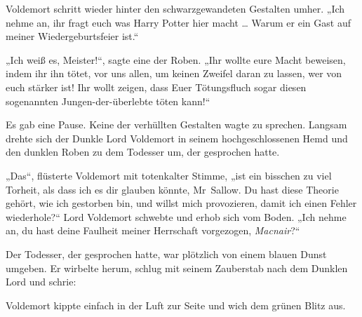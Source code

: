 Voldemort schritt wieder hinter den schwarzgewandeten Gestalten umher.
„Ich nehme an, ihr fragt euch was Harry Potter hier macht … Warum er ein Gast auf meiner Wiedergeburtsfeier ist.“

„Ich weiß es, Meister!“, sagte eine der Roben.
„Ihr wollte eure Macht beweisen, indem ihr ihn tötet, vor uns allen, um keinen Zweifel daran zu lassen, wer von euch stärker ist! Ihr wollt zeigen, dass Euer Tötungsfluch sogar diesen sogenannten Jungen-der-überlebte töten kann!“

Es gab eine Pause.
Keine der verhüllten Gestalten wagte zu sprechen.
Langsam drehte sich der Dunkle Lord Voldemort in seinem hochgeschlossenen Hemd und den dunklen Roben zu dem Todesser um, der gesprochen hatte.

„Das“, flüsterte Voldemort mit totenkalter Stimme, „ist ein bisschen zu viel Torheit, als dass ich es dir glauben könnte, Mr~Sallow. Du hast diese Theorie gehört, wie ich gestorben bin, und willst mich provozieren, damit ich einen Fehler wiederhole?“
Lord Voldemort schwebte und erhob sich vom Boden.
„Ich nehme an, du hast deine Faulheit meiner Herrschaft vorgezogen, \emph{Macnair}?“

Der Todesser, der gesprochen hatte, war plötzlich von einem blauen Dunst umgeben. Er wirbelte herum, schlug mit seinem Zauberstab nach dem Dunklen Lord und schrie: 

Voldemort kippte einfach in der Luft zur Seite und wich dem grünen Blitz aus.

